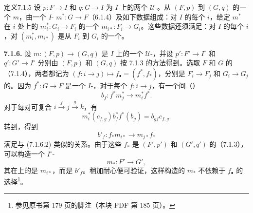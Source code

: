 \begin{SGAresult}{定义}{7.1.5}
设 $p:F\to I$ 和 $q:G\to I$ 为 $I$ 上的两个 $\mathcal U$-。从 $(F,p)$ 到 $(G,q)$ 的一个 $m$，由一个 $I$- $m^*:G\to F$（6.1.4）及如下数据组成：对 $I$ 的每个 $i$，给定 $m^*$ 在 $i$ 处上的 $m_i^*:G_i\to F_i$ 的一个 $m_{i*}:F_i\to G_i$。这些数据还须满足：对 $I$ 的每个 $i$，对 $(m_i^*,m_{i*})$ 是从 $F_i$ 到 $G_i$ 的一个。
\end{SGAresult}
\textbf{7.1.6.} 设 $m:(F,p)\to(G,q)$ 是 $I$ 上的一个 $\mathcal U$-，并设 $p':F'\to I^\circ$ 和 $q':G'\to I^\circ$ 分别由 $(F,p)$ 和 $(G,q)$ 按 7.1.3 的方法得到。选取 $F$ 和 $G$ 的（7.1.4），两者都记为 $(f:i\to j)\mapsto f_\bullet=(f^*,f_*)$，分别是 $F_i\to F_j$ 和 $G_i\to G_j$ 的。因为 $f^*:G\to F$ 是一个 $I$-，对于每个 $f:i\to j$，有一个间（）
\[b_f:f^*m_j^*\longrightarrow m_i^*f^*.\tag{7.1.6.1}\]
对于每对可复合 $i\xrightarrow f j\xrightarrow g k$，有
\[m_i^*(c_{f,g})b_f^*f^*(b_g)=b_{gf}c_{f,g}.\tag{7.1.6.2}\]
转到，得到
\[b'_f:f_*m_{i*}\longrightarrow m_{j*}f_*\tag{7.1.6.3}\]
满足与 (7.1.6.2) 类似的关系。由于这些 $f_*$ 是 $(F',p')$ 和 $(G',q')$ 的（7.1.3），可以构造一个 $I^\circ$-
\[m_*:F'\longrightarrow G',\tag{7.1.6.4}\]
其在上的是 $m_{i*}$，而是 $b'_f$。稍加耐心便可验证，这样构造的 $m_*$ 不依赖于 $f_\bullet$ 的选择\footnote{参见原书第 179 页的脚注（本块 PDF 第 185 页）。}。

